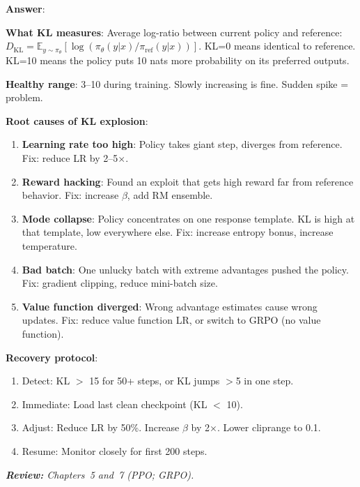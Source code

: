 \begin{questionbox}
\textbf{Answer}:

\textbf{What KL measures}: Average log-ratio between current policy and reference: $D_\text{KL} = \mathbb{E}_{y\sim\pi_\theta}[\log(\pi_\theta(y|x)/\pi_\text{ref}(y|x))]$. KL=0 means identical to reference. KL=10 means the policy puts 10 nats more probability on its preferred outputs.

\textbf{Healthy range}: 3--10 during training. Slowly increasing is fine. Sudden spike = problem.

\textbf{Root causes of KL explosion}:

\begin{enumerate}
  \item \textbf{Learning rate too high}: Policy takes giant step, diverges from reference. Fix: reduce LR by 2--5$\times$.
  \item \textbf{Reward hacking}: Found an exploit that gets high reward far from reference behavior. Fix: increase $\beta$, add RM ensemble.
  \item \textbf{Mode collapse}: Policy concentrates on one response template. KL is high at that template, low everywhere else. Fix: increase entropy bonus, increase temperature.
  \item \textbf{Bad batch}: One unlucky batch with extreme advantages pushed the policy. Fix: gradient clipping, reduce mini-batch size.
  \item \textbf{Value function diverged}: Wrong advantage estimates cause wrong updates. Fix: reduce value function LR, or switch to GRPO (no value function).
\end{enumerate}

\textbf{Recovery protocol}:

\begin{enumerate}
  \item Detect: KL $>$ 15 for 50+ steps, or KL jumps $>$5 in one step.
  \item Immediate: Load last clean checkpoint (KL $<$ 10).
  \item Adjust: Reduce LR by 50\%. Increase $\beta$ by 2$\times$. Lower cliprange to 0.1.
  \item Resume: Monitor closely for first 200 steps.
\end{enumerate}

\emph{\textbf{Review:} Chapters~5 and~7 (PPO; GRPO).}
\end{questionbox}

